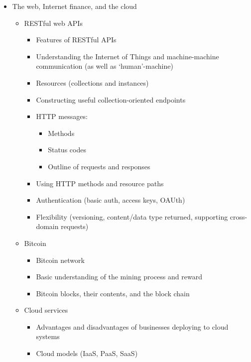 \documentclass[11pt,a4paper]{report}
\begin{document}
\begin{itemize}
    \item The web, Internet finance, and the cloud
        \begin{itemize}
            \item RESTful web APIs
                \begin{itemize}
                    \item Features of RESTful APIs
                    \item Understanding the Internet of Things and machine-machine communication (as well as `human'-machine)
                    \item Resources (collections and instances)
                    \item Constructing useful collection-oriented endpoints
                    \item HTTP messages:
                        \begin{itemize}
                            \item Methods
                            \item Status codes
                            \item Outline of requests and responses
                        \end{itemize}
                    \item Using HTTP methods and resource paths
                    \item Authentication (basic auth, access keys, OAUth)
                    \item Flexibility (versioning, content/data type returned, supporting cross-domain requests)
                \end{itemize}
            \item Bitcoin
                \begin{itemize}
                    \item Bitcoin network
                    \item Basic understanding of the mining process and reward
                    \item Bitcoin blocks, their contents, and the block chain
                \end{itemize}
            \item Cloud services
                \begin{itemize}
                    \item Advantages and disadvantages of businesses deploying to cloud systems
                    \item Cloud models (IaaS, PaaS, SaaS)

\end{itemize}
\end{itemize}
\end{itemize}
\end{document}
